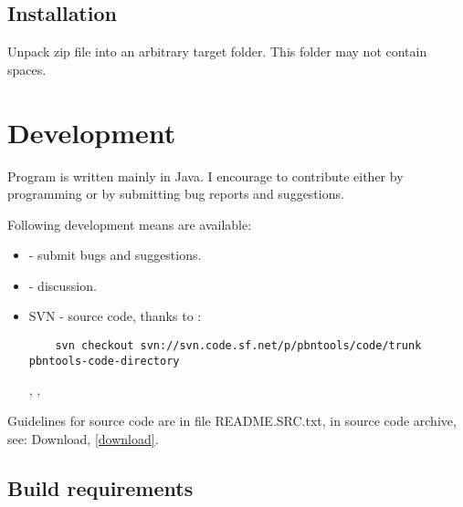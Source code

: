 \documentclass[polish,a4paper,11pt,oneside]{article}
\begin{document}
\subsection{Installation}
Unpack zip file into an arbitrary target folder.
This folder may not contain spaces.

\section{Development} \label{dev}

Program is written mainly in Java.
I encourage to contribute either by programming or by submitting bug reports and suggestions.

Following development means are available:

\begin{itemize}
\item
   -
  submit bugs and suggestions.
  
\item
   -
  discussion.
  
\item
  SVN - source code, thanks to 
  :
  \begin{verbatim}
    svn checkout svn://svn.code.sf.net/p/pbntools/code/trunk pbntools-code-directory
  \end{verbatim}

  , 
  , 

\end{itemize}

Guidelines for source code are in file README.SRC.txt,
in source code archive, see: Download, \ref{download}.

\subsection{Build requirements}
\end{document}
